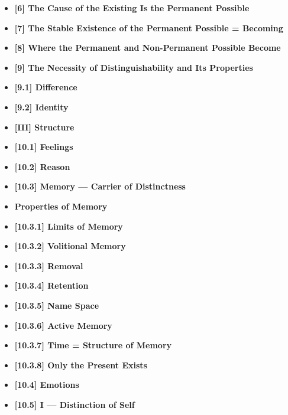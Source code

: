 \documentclass[12pt]{article}
\begin{document}
\begin{itemize}
\item \textbf{[6] The Cause of the Existing Is the Permanent Possible}

\item \textbf{[7] The Stable Existence of the Permanent Possible = Becoming}

\item \textbf{[8] Where the Permanent and Non-Permanent Possible Become}

\item \textbf{[9] The Necessity of Distinguishability and Its Properties}

\item \textbf{[9.1] Difference}

\item \textbf{[9.2] Identity}

\item \textbf{[III] Structure}

\item \textbf{[10.1] Feelings}

\item \textbf{[10.2] Reason}

\item \textbf{[10.3] Memory — Carrier of Distinctness}

\item \textbf{Properties of Memory}

\item \textbf{[10.3.1] Limits of Memory}

\item \textbf{[10.3.2] Volitional Memory}

\item \textbf{[10.3.3] Removal}

\item \textbf{[10.3.4] Retention}

\item \textbf{[10.3.5] Name Space}

\item \textbf{[10.3.6] Active Memory}

\item \textbf{[10.3.7] Time = Structure of Memory}

\item \textbf{[10.3.8] Only the Present Exists}

\item \textbf{[10.4] Emotions}

\item \textbf{[10.5] I — Distinction of Self}


\end{itemize}
\end{document}
